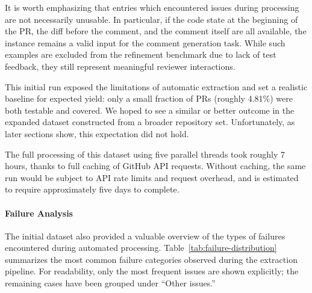 It is worth emphasizing that entries which encountered issues during processing are not necessarily
unusable. In particular, if the code state at the beginning of the PR, the diff before the comment,
and the comment itself are all available, the instance remains a valid input for the comment
generation task. While such examples are excluded from the refinement benchmark due to lack of test
feedback, they still represent meaningful reviewer interactions.

This initial run exposed the limitations of automatic extraction and set a realistic baseline for
expected yield: only a small fraction of PRs (roughly 4.81\%) were both testable and covered. We
hoped to see a similar or better outcome in the expanded dataset constructed from a broader
repository set. Unfortunately, as later sections show, this expectation did not hold.

The full processing of this dataset using five parallel threads took roughly 7 hours, thanks to full
caching of GitHub API requests. Without caching, the same run would be subject to API rate limits
and request overhead, and is estimated to require approximately five days to complete.

\paragraph{Failure Analysis}

The initial dataset also provided a valuable overview of the types of failures encountered during
automated processing. Table~\ref{tab:failure-distribution} summarizes the most common failure
categories observed during the extraction pipeline. For readability, only the most frequent issues
are shown explicitly; the remaining cases have been grouped under ``Other issues.''

